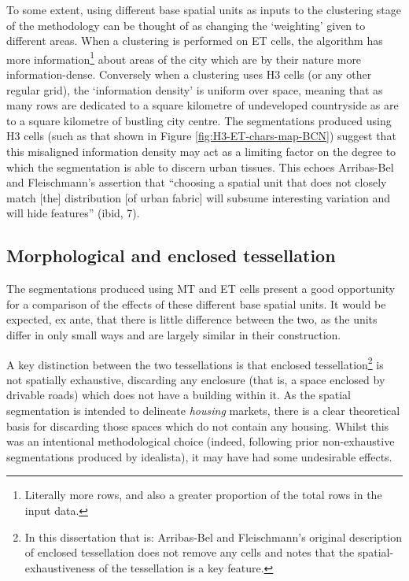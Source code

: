 \documentclass[a4paper, nobind]{templates/ociamthesis}
\begin{document}
To some extent, using different base spatial units as inputs to the clustering stage of the methodology can be thought of as changing the `weighting' given to different areas. When a clustering is performed on ET cells, the algorithm has more information\footnote{Literally more rows, and also a greater proportion of the total rows in the input data.} about areas of the city which are by their nature more information-dense. Conversely when a clustering uses H3 cells (or any other regular grid), the `information density' is uniform over space, meaning that as many rows are dedicated to a square kilometre of undeveloped countryside as are to a square kilometre of bustling city centre. The segmentations produced using H3 cells (such as that shown in Figure \ref{fig:H3-ET-chars-map-BCN}) suggest that this misaligned information density may act as a limiting factor on the degree to which the segmentation is able to discern urban tissues. This echoes Arribas-Bel and Fleischmann's \citeyearpar{dab_mf_2021} assertion that ``choosing a spatial unit that does not closely match {[}the{]} distribution {[}of urban fabric{]} will subsume interesting variation and will hide features'' (ibid, 7).

\hypertarget{morphological-and-enclosed-tessellation}{%
\subsection{Morphological and enclosed tessellation}\label{morphological-and-enclosed-tessellation}}

The segmentations produced using MT and ET cells present a good opportunity for a comparison of the effects of these different base spatial units. It would be expected, ex ante, that there is little difference between the two, as the units differ in only small ways and are largely similar in their construction.

A key distinction between the two tessellations is that enclosed tessellation\footnote{In this dissertation that is: Arribas-Bel and Fleischmann's original description of enclosed tessellation does not remove any cells and notes that the spatial-exhaustiveness of the tessellation is a key feature.} is not spatially exhaustive, discarding any enclosure (that is, a space enclosed by drivable roads) which does not have a building within it. As the spatial segmentation is intended to delineate \emph{housing} markets, there is a clear theoretical basis for discarding those spaces which do not contain any housing. Whilst this was an intentional methodological choice (indeed, following prior non-exhaustive segmentations produced by idealista), it may have had some undesirable effects.
\end{document}
